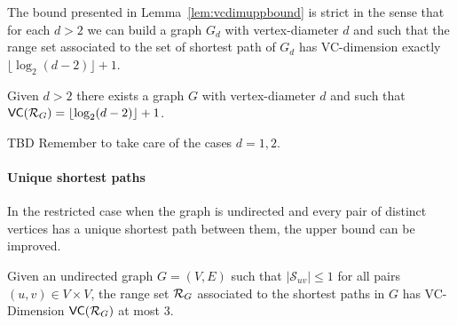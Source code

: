 The bound presented in Lemma~\ref{lem:vcdimuppbound} is strict in the sense that
for each $d>2$ we can build a graph $G_d$ with vertex-diameter $d$ and such
that the range set associated to the set of shortest path of $G_d$ has
VC-dimension exactly $\lfloor\log_2(d-2)\rfloor+1$.

\begin{lemma}\label{lem:vcdimlowbound}
  Given $d>2$ there exists a graph $G$ with vertex-diameter $d$ and such that
  $\mathsf{VC}(\mathcal{R}_G)=\lfloor\log_2(d-2)\rfloor+1$.
\end{lemma}

\begin{IEEEproof}
  \XXX TBD Remember to take care of the cases $d=1,2$.
\end{IEEEproof}

\paragraph{Unique shortest paths}
In the restricted case when the graph is undirected and every pair of distinct vertices
has a unique shortest path between them, the upper bound can be improved.
\begin{lemma}\label{lem:vcdimuppboundunique}
  Given an undirected graph $G=(V,E)$ such that $|\mathcal{S}_{uv}|\le1$ for all
  pairs $(u,v)\in V\times V$, the range set $\mathcal{R}_G$ associated to the
  shortest paths in $G$ has VC-Dimension $\mathsf{VC}(\mathcal{R}_G)$ at most $3$.
\end{lemma}

